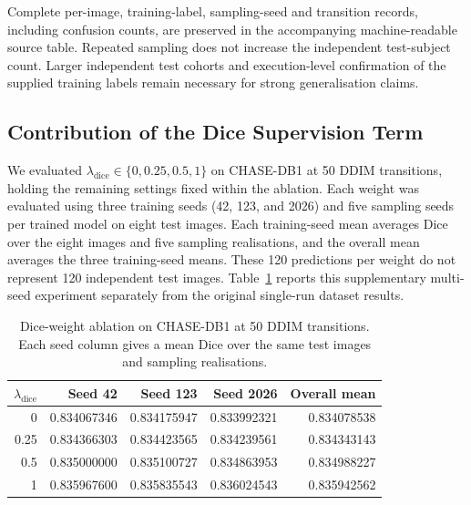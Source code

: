 \documentclass[jimaging,article,submit,pdftex,moreauthors]{Definitions/mdpi}%
\begin{document}
Complete per-image, training-label, sampling-seed and transition records, including confusion counts, are preserved in the accompanying machine-readable source table. Repeated sampling does not increase the independent test-subject count. Larger independent test cohorts and execution-level confirmation of the supplied training labels remain necessary for strong generalisation claims.



\subsection{Contribution of the Dice Supervision Term}

\label{sec:dice_weight_ablation}



We evaluated $\lambda_{\mathrm{dice}}\in\{0,0.25,0.5,1\}$ on CHASE-DB1 at 50 DDIM transitions, holding the remaining settings fixed within the ablation. Each weight was evaluated using three training seeds (42, 123, and 2026) and five sampling seeds per trained model on eight test images. Each training-seed mean averages Dice over the eight images and five sampling realisations, and the overall mean averages the three training-seed means. These 120 predictions per weight do not represent 120 independent test images. Table~\ref{tab:dice_weight_seed_means} reports this supplementary multi-seed experiment separately from the original single-run dataset results.



\begin{table}[htbp]
\centering
\caption{Dice-weight ablation on CHASE-DB1 at 50 DDIM transitions. Each seed column gives a mean Dice over the same test images and sampling realisations.}
\label{tab:dice_weight_seed_means}
\scriptsize
\begin{tabular}{rrrrr}
\toprule
$\lambda_{\mathrm{dice}}$ & Seed 42 & Seed 123 & Seed 2026 & Overall mean \\
\midrule
0 & 0.834067346 & 0.834175947 & 0.833992321 & 0.834078538 \\
0.25 & 0.834366303 & 0.834423565 & 0.834239561 & 0.834343143 \\
0.5 & 0.835000000 & 0.835100727 & 0.834863953 & 0.834988227 \\
1 & 0.835967600 & 0.835835543 & 0.836024543 & 0.835942562 \\
\bottomrule
\end{tabular}
\end{table}
\end{document}
